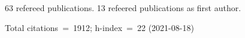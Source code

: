 63 refereed publications. 13 refeered publications as first author.

Total citations~=~1912; h-index~=~22 (2021-08-18)